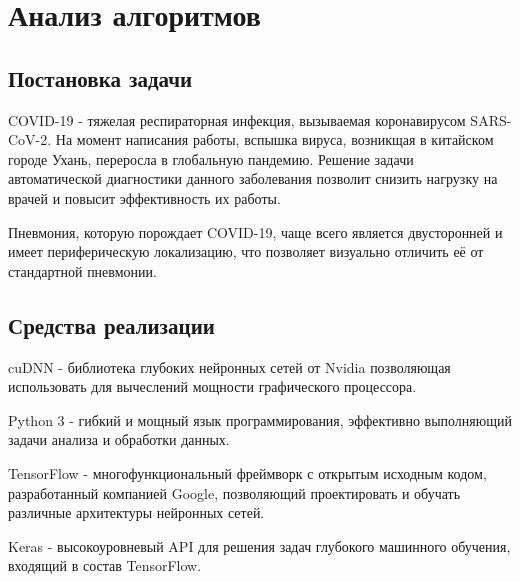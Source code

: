 \section{Анализ алгоритмов} \label{Dev}

\subsection{Постановка задачи}
COVID-19 - тяжелая респираторная инфекция, вызываемая коронавирусом SARS-CoV-2. На момент написания работы, вспышка вируса, возникщая в китайском городе Ухань, переросла в глобальную пандемию. Решение задачи автоматической диагностики данного заболевания позволит снизить нагрузку на врачей и повысит эффективность их работы.

Пневмония, которую порождает COVID-19, чаще всего является двусторонней и имеет периферическую локализацию, что позволяет визуально отличить её от стандартной пневмонии.


\subsection{Средства реализации}
cuDNN - библиотека глубоких нейронных сетей от Nvidia позволяющая использовать для вычеслений мощности графического процессора.

Python 3 - гибкий и мощный язык программирования, эффективно выполняющий задачи анализа и обработки данных.

TensorFlow - многофункциональный фреймворк с открытым исходным кодом, разработанный компанией Google, позволяющий проектировать и обучать различные архитектуры нейронных сетей.

Keras - высокоуровневый API для решения задач глубокого машинного обучения, входящий в состав TensorFlow.



